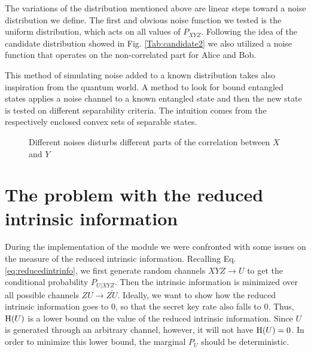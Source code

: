 	The variations of the distribution mentioned above are linear steps toward a noise distribution we define.
	The first and obvious noise function we tested is the uniform distribution, which acts on all values of $P_{XYZ}$.
	Following the idea of the candidate distribution showed in Fig. \ref{Tab:candidate2} we  also utilized a noise function that operates on the non-correlated part for Alice and Bob.
	
	This method of simulating noise added to a known distribution takes also inspiration from the quantum world. 
	A method to look for bound entangled states applies a noise channel to a known entangled state and then the new state is tested on different separability criteria.
	The intuition comes from the respectively enclosed convex sets of separable states.
	
	 
	\begin{figure}
		\begin{subfigure}{0.5\textwidth}
			
			\label{Fig:noise1}
		\end{subfigure}
		\begin{subfigure}{0.5\textwidth}
			
			\label{Fig:noise2}
		\end{subfigure}
		\caption{Different noises disturbs different parts of the correlation between $X$ and $Y$}
		\label{Fig:noises}
	\end{figure}
	
\section{The problem with the reduced intrinsic information}\label{problem}
    During the implementation of the module we were confronted with some issues on the measure of the reduced intrinsic information.
    Recalling Eq. \ref{eq:reducedintrinfo}, we first generate random channels $XYZ \rightarrow U$ to get the conditional probability $P_{U|XYZ}$. 
    Then the intrinsic information is minimized over all possible channels $ZU \rightarrow \bar{ZU}$.
    Ideally, we want to show how the reduced intrinsic information goes to $0$, so that the secret key rate also falls to $0$. 
    Thus, $\operatorname{H} (U)$ is a lower bound on the value of the reduced intrinsic information.
    Since $U$ is generated through an arbitrary channel, however, it will not have $\operatorname{H} (U) = 0$.
    In order to minimize this lower bound, the marginal $P_U$ should be deterministic.
    

